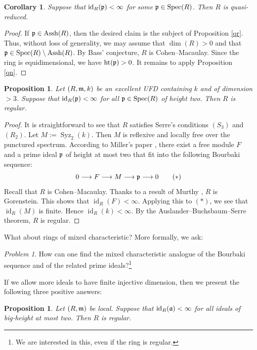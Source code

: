 \documentclass[10. pt,a4paper]{amsart}
\newtheorem{proposition}[theorem]{Proposition}
\newtheorem{corollary}[theorem]{Corollary}
\theoremstyle{definition}
\theoremstyle{remark}
\newtheorem{problem}[theorem]{Problem}
\newcommand{\Assh}{\operatorname{Assh}}
\newcommand{\Spec}{\operatorname{Spec}}
\newcommand{\id}{\operatorname{id}}
\newcommand{\fm}{\frak{m}}
\newcommand{\fp}{\frak{p}}
\newcommand{\fa}{\frak{a}}
\begin{document}
\begin{corollary}\label{pgen}
	Suppose that $\id_R(\fp)<\infty$ for some $\fp\in\Spec(R)$. Then $R$ is quasi-reduced.
\end{corollary}

\begin{proof}
	If $\fp\in\Assh(R)$, then the desired claim is the subject of Proposition \ref{qr}. Thus, without loss of generality, we may assume that $\dim(R)>0$ and that $\fp\in\Spec(R)\setminus\Assh(R)$. By Bass'  conjecture, $R$ is Cohen--Macaulay. Since the ring is equidimensional, we have $\operatorname{ht}(\fp)>0$. It remains to apply Proposition \ref{qn}.
\end{proof}

\begin{proposition}
	Let $(R,\fm,k)$ be an excellent UFD containing $k$ and of dimension $>3$. Suppose that $\id_R(\fp)<\infty$ for all $\fp\in\Spec(R)$ of height two. Then $R$ is regular.
\end{proposition}

\begin{proof}
	It is straightforward to see that $R$ satisfies Serre's conditions $(S_3)$ and $(R_2)$. Let $M:=\operatorname{Syz}_2(k)$. Then $M$ is reflexive and locally free over the punctured spectrum. According to Miller's paper \cite{MILL}, there exist a free module $F$ and a prime ideal $\fp$ of height at most two that fit into the following Bourbaki sequence:
	\[
	0 \longrightarrow F \longrightarrow M \longrightarrow \fp \longrightarrow 0 \qquad (\ast)
	\]
	Recall that $R$ is Cohen--Macaulay. Thanks to a result of Murthy \cite[3.3.19]{BH}, $R$ is Gorenstein. This shows that $\id_R(F)<\infty$. Applying this to $(\ast)$, we see that $\id_R(M)$ is finite. Hence $\id_R(k)<\infty$. By the Auslander--Buchsbaum--Serre theorem, $R$ is regular.
\end{proof}

What about rings of mixed characteristic? More formally, we ask:

\begin{problem}
	How can one find the mixed characteristic analogue of the Bourbaki sequence and of the related prime ideals?\footnote{We are interested in this, even if the ring is regular.}
\end{problem}

If we allow more ideals to have finite injective dimension, then we present the following three positive answers:

\begin{proposition}\label{baus}
	Let $(R,\fm)$ be local. Suppose that $\id_R(\fa)<\infty$ for all ideals of big-height at most two. Then $R$ is regular.
\end{proposition}
\end{document}

